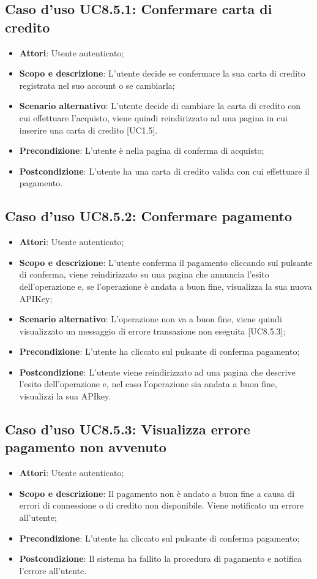 \documentclass[12pt,a4paper,titlepage]{article}
\begin{document}
	\subsection{Caso d'uso UC8.5.1: Confermare carta di credito}
	\label{UC8.5.1}
	\begin{itemize}
		\item \textbf{Attori}: Utente autenticato;
		\item \textbf{Scopo e descrizione}: L'utente decide se confermare la sua carta di credito registrata nel suo account o se cambiarla;
		\item \textbf{Scenario alternativo}: L'utente decide di cambiare la carta di credito con cui effettuare l'acquisto, viene quindi reindirizzato ad una pagina in cui inserire una carta di credito [UC1.5].
		\item \textbf{Precondizione}: L'utente è nella pagina di conferma di acquisto;
		\item \textbf{Postcondizione}: L'utente ha una carta di credito valida con cui effettuare il pagamento.
	\end{itemize}
	\subsection{Caso d'uso UC8.5.2: Confermare pagamento}
	\label{UC8.5.2}
	\begin{itemize}
		\item \textbf{Attori}: Utente autenticato;
		\item \textbf{Scopo e descrizione}: L'utente conferma il pagamento cliccando sul pulsante di conferma, viene reindirizzato su una pagina che annuncia l'esito dell'operazione e, se l'operazione è andata a buon fine, visualizza la sua nuova APIKey;
		\item \textbf{Scenario alternativo}: L'operazione non va a buon fine, viene quindi visualizzato un messaggio di errore transazione non eseguita [UC8.5.3];
		\item \textbf{Precondizione}: L'utente ha cliccato sul pulsante di conferma pagamento;
		\item \textbf{Postcondizione}: L'utente viene reindirizzato ad una pagina che descrive l'esito dell'operazione e, nel caso l'operazione sia andata a buon fine, visualizzi la sua APIkey.
	\end{itemize}
	\subsection{Caso d'uso UC8.5.3: Visualizza errore pagamento non avvenuto}
	\label{UC8.5.3}
	\begin{itemize}
		\item \textbf{Attori}: Utente autenticato;
		\item \textbf{Scopo e descrizione}: Il pagamento non è andato a buon fine a causa di errori di connessione o di credito non disponibile. Viene notificato un errore all'utente;
		\item \textbf{Precondizione}: L'utente ha cliccato sul pulsante di conferma pagamento;
		\item \textbf{Postcondizione}: Il sistema ha fallito la procedura di pagamento e notifica l'errore all'utente.
	\end{itemize}
\end{document}

